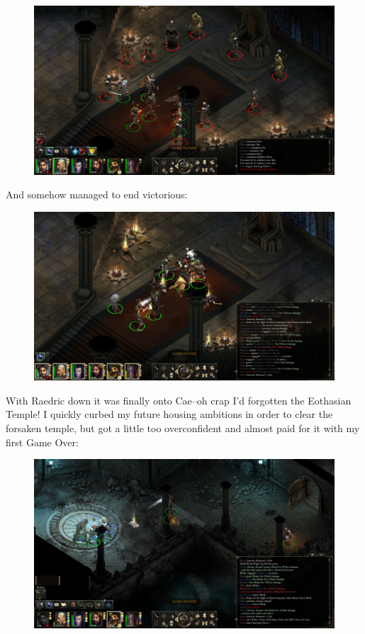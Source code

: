 \documentclass{article}
\begin{document}
\begin{figure}
\includegraphics[scale=0.33]{files/blog/2018_06_16_pillars_of_eternity_path_of_the_damned_act_i/2018_06_16_raedric_before.jpg}
\end{figure}

And somehow managed to end victorious:

\begin{figure}
\includegraphics[scale=0.33]{files/blog/2018_06_16_pillars_of_eternity_path_of_the_damned_act_i/2018_06_16_raedric_after.jpg}
\end{figure}

With Raedric down it was finally onto Cae--oh crap I'd forgotten the Eothasian Temple!  I quickly curbed my future housing ambitions in order to clear the forsaken temple, but got a little too overconfident and almost paid for it with my first Game Over:

\begin{figure}
\includegraphics[scale=0.33]{files/blog/2018_06_16_pillars_of_eternity_path_of_the_damned_act_i/2018_06_16_temple_neardeath.jpg}
\end{figure}
\end{document}

